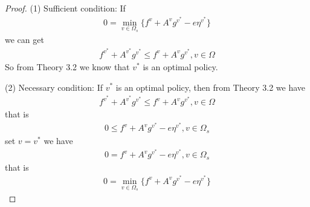 \documentclass[runningheads]{llncs}
\begin{document}
    \subsection{}
    \begin{proof}
        \par
        (1) Sufficient condition: If
        \begin{align}
            0 = \mathop{\min}_{v \in \Omega_s} \{ f^v + A^v g^{v^*} - e \eta^{v^*} \}
        \end{align}
        we can get
        \begin{align}
            f^{v^*} + A^{v^*} g^{v^*} \leq f^v + A^v g^{v^*}, v \in \Omega
        \end{align}
        So from Theory 3.2 we know that $v^*$ is an optimal policy.
        \par
        (2) Necessary condition: If $v^*$ is an optimal policy, then from Theory 3.2
        we have
        \begin{align}
            f^{v^*} + A^{v^*} g^{v^*} \leq f^v + A^v g^{v^*}, v \in \Omega
        \end{align}
        that is
        \begin{align}
            0 \leq f^v + A^v g^{v^*} - e \eta^{v^*}, v \in \Omega_s
        \end{align}
        set $v = v^*$
        we have
        \begin{align}
            0 = f^v + A^v g^{v^*} - e \eta^{v^*}, v \in \Omega_s
        \end{align}
        that is
        \begin{align}
            0 = \mathop{\min}_{v \in \Omega_s} \{ f^v + A^v g^{v^*} - e \eta^{v^*} \}
        \end{align}
    \end{proof}
\end{document}
